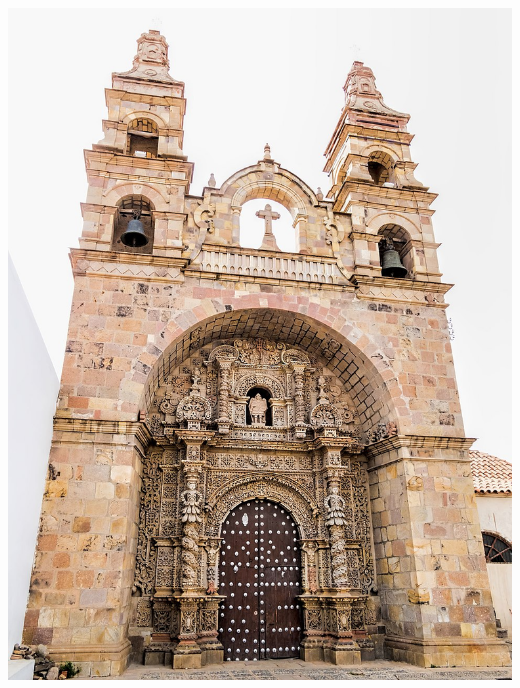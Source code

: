 \documentclass[class=article, crop=false]{standalone}
\begin{document}
\begin{center}
    \includegraphics[width=\textwidth]{San Lorenzo de Carangas.jpg}
\end{center}
\end{document}

